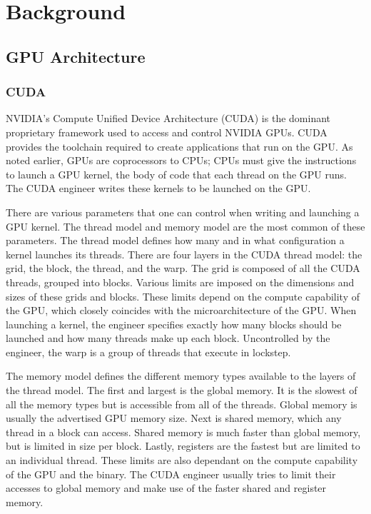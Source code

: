 \chapter{Background}
\label{chap:background}
\section{GPU Architecture}

\subsection{CUDA}

NVIDIA's Compute Unified Device Architecture (CUDA) is the dominant proprietary framework used to access and control NVIDIA GPUs.
CUDA provides the toolchain required to create applications that run on the GPU.
As noted earlier, GPUs are coprocessors to CPUs; CPUs must give the instructions to launch a GPU kernel, the body of code that each thread on the GPU runs.
The CUDA engineer writes these kernels to be launched on the GPU.

There are various parameters that one can control when writing and launching a GPU kernel.
The thread model and memory model are the most common of these parameters.
The thread model defines how many and in what configuration a kernel launches its threads.
There are four layers in the CUDA thread model: the grid, the block, the thread, and the warp.
The grid is composed of all the CUDA threads, grouped into blocks.
Various limits are imposed on the dimensions and sizes of these grids and blocks.
These limits depend on the compute capability of the GPU, which closely coincides with the microarchitecture of the GPU.
When launching a kernel, the engineer specifies exactly how many blocks should be launched and how many threads make up each block.
Uncontrolled by the engineer, the warp is a group of threads that execute in lockstep.

The memory model defines the different memory types available to the layers of the thread model.
The first and largest is the global memory.
It is the slowest of all the memory types but is accessible from all of the threads.
Global memory is usually the advertised GPU memory size.
Next is shared memory, which any thread in a block can access.
Shared memory is much faster than global memory, but is limited in size per block.
Lastly, registers are the fastest but are limited to an individual thread.
These limits are also dependant on the compute capability of the GPU and the binary.
The CUDA engineer usually tries to limit their accesses to global memory and make use of the faster shared and register memory.

